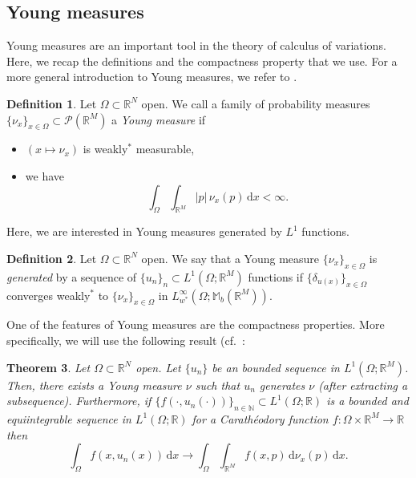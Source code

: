 \documentclass[a4paper, 11pt, reqno]{amsart}
\theoremstyle{plain}
\newtheorem{theorem}{Theorem}[section]
\theoremstyle{definition}
\newtheorem{definition}[theorem]{Definition}
\theoremstyle{remark}
\newcommand{\N}{\mathbb N}
\newcommand{\R}{\mathbb R}
\newcommand{\M}{\mathbb M}
\begin{document}
\subsection{Young measures}
Young measures are an important tool in the theory of calculus of variations. Here, we recap the definitions and the compactness property that we use. For a more general introduction to Young measures, we refer to \cite{RindlerCalcVarBook}.
\begin{definition}
    Let $\Omega \subset \R^N$ open. We call a family of probability measures $\{\nu_x\}_{x \in \Omega} \subset \mathcal P(\R^M)$ a \emph{Young measure} if
    \begin{itemize}
        \item $(x \mapsto \nu_x)$ is weakly$^*$ measurable,
        \item we have 
        \[
            \int_\Omega  \int_{\R^M} |p| \, \nu_x(p) \, \mathrm d x < \infty.
        \]
    \end{itemize}
\end{definition}
Here, we are interested in Young measures generated by $L^1$ functions.
\begin{definition}
    Let $\Omega \subset \R^N$ open. We say that a Young measure $\{\nu_x\}_{x \in \Omega}$ is \emph{generated} by a sequence of $\{u_n \}_n \subset L^1(\Omega; \R^M)$ functions if $\{\delta_{u(x)}\}_{x \in \Omega}$ converges weakly$^*$ to $\{\nu_x\}_{x \in \Omega}$ in $L^\infty_{w^*}(\Omega; \M_b(\R^M))$.
\end{definition}
One of the features of Young measures are the compactness properties. More specifically, we will use the following result (cf.\ \cite[Lemma 4.3]{RindlerCalcVarBook}:
\begin{theorem}\label{thm:compactness_YM}
    Let $\Omega \subset \R^N$ open. Let $\{u_n\}$ be an bounded sequence in $L^1(\Omega; \R^M)$. Then, there exists a Young measure $\nu$ such that $u_n$ generates $\nu$ (after extracting a subsequence). Furthermore, if $\{f(\cdot , u_n(\cdot))\}_{n \in \N} \subset L^1(\Omega; \R)$ is a bounded and equiintegrable sequence in $L^1(\Omega; \R)$ for a Carath\'eodory function $f: \Omega \times \R^M \to \R$ then 
    \[
        \int_\Omega f(x, u_n(x)) \, \mathrm d x \to \int_\Omega \int_{\R^M} f(x, p) \, \mathrm d \nu_x(p) \, \mathrm d x.
    \]
\end{theorem}


\end{document}
